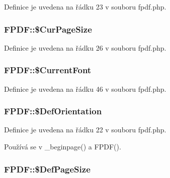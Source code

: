 Definice je uvedena na řádku 23 v souboru fpdf.\-php.

\hypertarget{class_f_p_d_f_a1d6aba267d684bb14898c66ab6ecc292}{
\subsubsection[{\$\-Cur\-Page\-Size}]{\setlength{\rightskip}{0pt plus 5cm}F\-P\-D\-F\-::\$\-Cur\-Page\-Size}}\label{class_f_p_d_f_a1d6aba267d684bb14898c66ab6ecc292}


Definice je uvedena na řádku 26 v souboru fpdf.\-php.

\hypertarget{class_f_p_d_f_a48fd94c929ceac390039ac4928fd8110}{
\subsubsection[{\$\-Current\-Font}]{\setlength{\rightskip}{0pt plus 5cm}F\-P\-D\-F\-::\$\-Current\-Font}}\label{class_f_p_d_f_a48fd94c929ceac390039ac4928fd8110}


Definice je uvedena na řádku 46 v souboru fpdf.\-php.

\hypertarget{class_f_p_d_f_ad1640384fda9ee53cf7295eb823a31dc}{
\subsubsection[{\$\-Def\-Orientation}]{\setlength{\rightskip}{0pt plus 5cm}F\-P\-D\-F\-::\$\-Def\-Orientation}}\label{class_f_p_d_f_ad1640384fda9ee53cf7295eb823a31dc}


Definice je uvedena na řádku 22 v souboru fpdf.\-php.



Používá se v \-\_\-beginpage() a F\-P\-D\-F().

\hypertarget{class_f_p_d_f_a25da1996ae79613866cd98df244b43ba}{
\subsubsection[{\$\-Def\-Page\-Size}]{\setlength{\rightskip}{0pt plus 5cm}F\-P\-D\-F\-::\$\-Def\-Page\-Size}}\label{class_f_p_d_f_a25da1996ae79613866cd98df244b43ba}


